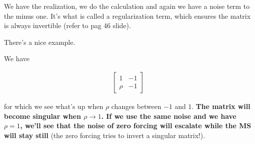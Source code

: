 \documentclass[a4paper, 12pt]{book}
\begin{document}
\vspace{0.5cm}

We have the realization, we do the calculation and again we have a noise term to the minus one. It's what is called a regularization term, which ensures the matrix is always invertible (refer to \colorbox{yellow!30}{pag 46 slide}).

There's a nice example.

We have

\begin{align*}
\begin{bmatrix}
1 & -1 \\
\rho & -1
\end{bmatrix}
\end{align*}

for which we see what's up when $\rho$ changes between $-1$ and $1$. \textbf{The matrix will become singular when $\rho \to 1$. If we use the same noise and we have $\rho = 1$, we'll see that the noise of zero forcing will escalate while the MS will stay still} (the zero forcing tries to invert a singular matrix!).

\vspace{0.5cm}
\noindent\colorbox{white}{%
    \setlength{\fboxrule}{0pt}%
    \setlength{\fboxsep}{0pt}%
}
\end{document}
